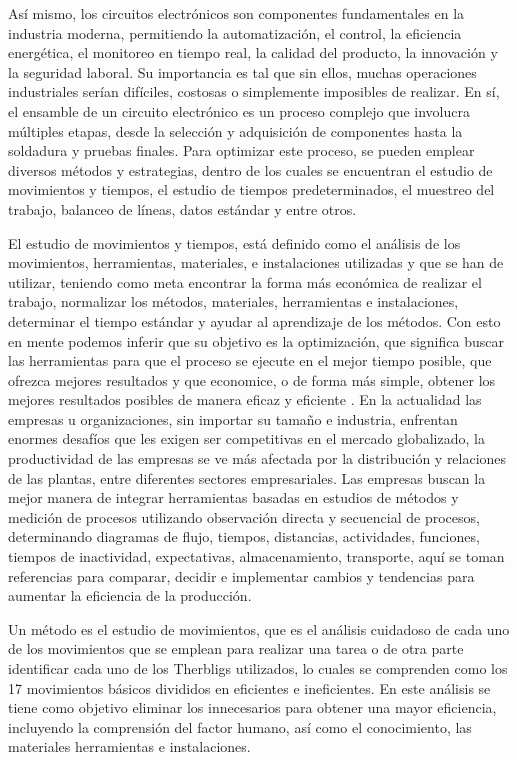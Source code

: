     Así mismo, los circuitos electrónicos son componentes fundamentales en la industria moderna, permitiendo la automatización, el control, la eficiencia energética, el monitoreo en tiempo real, la calidad del producto, la innovación y la seguridad laboral. Su importancia es tal que sin ellos, muchas operaciones industriales serían difíciles, costosas o simplemente imposibles de realizar. En sí, el ensamble de un circuito electrónico es un proceso complejo que involucra múltiples etapas, desde la selección y adquisición de componentes hasta la soldadura y pruebas finales. Para optimizar este proceso, se pueden emplear diversos métodos y estrategias, dentro de los cuales se encuentran el estudio de movimientos y tiempos, el estudio de tiempos predeterminados, el muestreo del trabajo, balanceo de líneas, datos estándar y entre otros.
    
    El estudio de movimientos y tiempos, está definido como el análisis de los movimientos, herramientas, materiales, e instalaciones utilizadas y que se han de utilizar, teniendo como meta encontrar la forma más económica de realizar el trabajo, normalizar los métodos, materiales, herramientas e instalaciones, determinar el tiempo estándar y ayudar al aprendizaje de los métodos. Con esto en mente podemos inferir que su objetivo es la optimización, que significa buscar las herramientas para que el proceso se ejecute en el mejor tiempo posible, que ofrezca mejores resultados y que economice, o de forma más simple, obtener los mejores resultados posibles de manera eficaz y eficiente  \cite{RAE}. En la actualidad las empresas u organizaciones, sin importar su tamaño e industria, enfrentan enormes desafíos que les exigen ser competitivas en el mercado globalizado, la productividad de las empresas se ve más afectada por la distribución y relaciones de las plantas, entre diferentes sectores empresariales. Las empresas buscan la mejor manera de integrar herramientas basadas en estudios de métodos y medición de procesos utilizando observación directa y secuencial de procesos, determinando diagramas de flujo, tiempos, distancias, actividades, funciones, tiempos de inactividad, expectativas, almacenamiento, transporte, aquí se toman referencias para comparar, decidir e implementar cambios y tendencias para aumentar la eficiencia de la producción. 
    
    Un método es el estudio de movimientos, que es el análisis cuidadoso de cada uno de los movimientos que se emplean para realizar una tarea o de otra parte identificar cada uno de los Therbligs utilizados, lo cuales se comprenden como los 17 movimientos básicos divididos en eficientes e ineficientes. \cite{niebel1980ingenieria} En este análisis se tiene como objetivo eliminar los innecesarios para obtener una mayor eficiencia, incluyendo la comprensión del factor humano, así como el conocimiento, las materiales herramientas e instalaciones.
    
